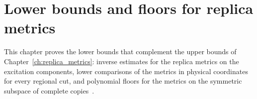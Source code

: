 \chapter{Lower bounds and floors for replica metrics}
\label{ch:replica_lower_bounds}

This chapter proves the lower bounds that complement the upper bounds of
Chapter~\ref{ch:replica_metrics}: inverse estimates for the replica metrics on
the excitation components, lower comparisons of the metrics in physical
coordinates for every regional cut, and polynomial floors for the metrics on
the symmetric subspace of complete copies~\cite{OpenAI2026AreaLaw}.
























